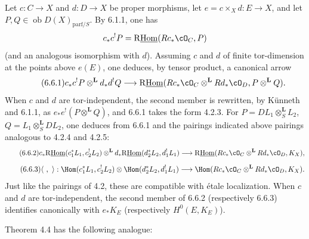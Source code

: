 Let $c:C\to X$ and $d:D\to X$ be proper morphisms, let $e=c\times_Xd:E\to X$, and let $P,Q\in\operatorname{ob}D(X)_{\mathrm{parf}/S}$. By 6.1.1, one has
\[
c_*c^!P=\mathrm{R}\underline{\mathrm{Hom}}(Rc_*\cO_C,P)
\]
(and an analogous isomorphism with $d$). Assuming $c$ and $d$ of finite tor-dimension at the points above $e(E)$, one deduces, by tensor product, a canonical arrow
\begin{equation}
\tag{6.6.1}
c_*c^!P\otimes^{\mathbf L}d_*d^!Q\longrightarrow
\mathrm{R}\underline{\mathrm{Hom}}(Rc_*\cO_C\otimes^{\mathbf L}Rd_*\cO_D,P\otimes^{\mathbf L}Q).
\end{equation}
When $c$ and $d$ are tor-independent, the second member is rewritten, by Künneth and 6.1.1, as $e_*e^!(P\otimes^{\mathbf L}Q)$, and 6.6.1 takes the form 4.2.3. For $P=DL_1\otimes_S^{\mathbf L}L_2$, $Q=L_1\otimes_S^{\mathbf L}DL_2$, one deduces from 6.6.1 and the pairings indicated above pairings analogous to 4.2.4 and 4.2.5:
\begin{equation}
\tag{6.6.2}
c_*\mathrm{R}\underline{\mathrm{Hom}}(c_1^*L_1,c_2^!L_2)\otimes^{\mathbf L}d_*\mathrm{R}\underline{\mathrm{Hom}}(d_2^*L_2,d_1^!L_1)
\longrightarrow\mathrm{R}\underline{\mathrm{Hom}}(Rc_*\cO_C\otimes^{\mathbf L}Rd_*\cO_D,K_X),
\end{equation}
\begin{equation}
\tag{6.6.3}
\langle\ ,\ \rangle:\Hom(c_1^*L_1,c_2^!L_2)\otimes\Hom(d_2^*L_2,d_1^!L_1)
\longrightarrow\Hom(Rc_*\cO_C\otimes^{\mathbf L}Rd_*\cO_D,K_X).
\end{equation}
Just like the pairings of 4.2, these are compatible with étale localization. When $c$ and $d$ are tor-independent, the second member of 6.6.2 (respectively 6.6.3) identifies canonically with $e_*K_E$ (respectively $H^0(E,K_E)$).

Theorem 4.4 has the following analogue:

